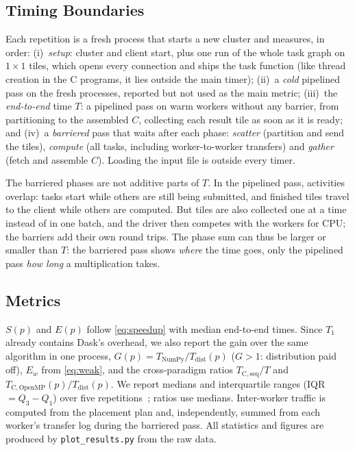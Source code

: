 \documentclass[conference,a4paper]{IEEEtran}
\newcommand{\code}[1]{\texttt{#1}}
\newcommand{\Tdist}{T_{\mathrm{dist}}}
\newcommand{\Tnp}{T_{\mathrm{NumPy}}}
\begin{document}
\subsection{Timing Boundaries}
\label{sec:timing}
Each repetition is a fresh process that starts a new cluster and measures, in
order: (i)~\emph{setup}: cluster and client start, plus one run of the whole
task graph on $1 \times 1$ tiles, which opens every connection and ships the
task function (like thread creation in the C programs, it lies outside the main
timer); (ii)~a \emph{cold} pipelined pass on the fresh processes, reported but
not used as the main metric; (iii)~the \emph{end-to-end} time $T$: a pipelined
pass on warm workers without any barrier, from partitioning to the assembled
$C$, collecting each result tile as soon as it is ready; and (iv)~a
\emph{barriered} pass that waits after each phase: \emph{scatter} (partition and
send the tiles), \emph{compute} (all tasks, including worker-to-worker
transfers) and \emph{gather} (fetch and assemble $C$). Loading the input file
is outside every timer.

The barriered phases are not additive parts of $T$. In the pipelined pass,
activities overlap: tasks start while others are still being submitted, and
finished tiles travel to the client while others are computed. But tiles are
also collected one at a time instead of in one batch, and the driver then
competes with the workers for CPU; the barriers add their own round trips.
The phase sum can thus be larger or smaller than $T$: the barriered pass shows
\emph{where} the time goes, only the pipelined pass \emph{how long} a
multiplication takes.

\subsection{Metrics}
\label{sec:metrics}
$S(p)$ and $E(p)$ follow \eqref{eq:speedup} with median end-to-end times. Since
$T_1$ already contains Dask's overhead, we also report the gain over the same
algorithm in one process, $G(p) = \Tnp / \Tdist(p)$ ($G > 1$: distribution paid
off), $E_w$ from \eqref{eq:weak}, and the cross-paradigm ratios
$T_{\mathrm{C,seq}}/T$ and $T_{\mathrm{C,OpenMP}}(p)/\Tdist(p)$. We report
medians and interquartile ranges (IQR $= Q_3 - Q_1$) over five
repetitions~\cite{georges2007}; ratios use medians. Inter-worker
traffic is computed from the placement plan and, independently, summed from
each worker's transfer log during the barriered pass. All statistics and figures
are produced by \code{plot\_results.py} from the raw data.
\end{document}
